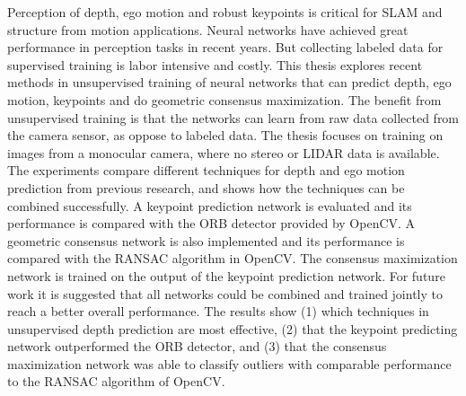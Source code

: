 Perception of depth, ego motion and robust keypoints is critical for SLAM and structure from motion applications. Neural networks have achieved great performance in perception tasks in recent years. But collecting labeled data for supervised training is labor intensive and costly. This thesis explores recent methods in unsupervised training of neural networks that can predict depth, ego motion, keypoints and do geometric consensus maximization. The benefit from unsupervised training is that the networks can learn from raw data collected from the camera sensor, as oppose to labeled data. The thesis focuses on training on images from a monocular camera, where no stereo or LIDAR data is available. The experiments compare different techniques for depth and ego motion prediction from previous research, and shows how the techniques can be combined successfully. A keypoint prediction network is evaluated and its performance is compared with the ORB detector provided by OpenCV. A geometric consensus network is also implemented and its performance is compared with the RANSAC algorithm in OpenCV. The consensus maximization network is trained on the output of the keypoint prediction network. For future work it is suggested that all networks could be combined and trained jointly to reach a better overall performance. The results show (1) which techniques in unsupervised depth prediction are most effective, (2) that the keypoint predicting network outperformed the ORB detector, and (3) that the consensus maximization network was able to classify outliers with comparable performance to the RANSAC algorithm of OpenCV.
